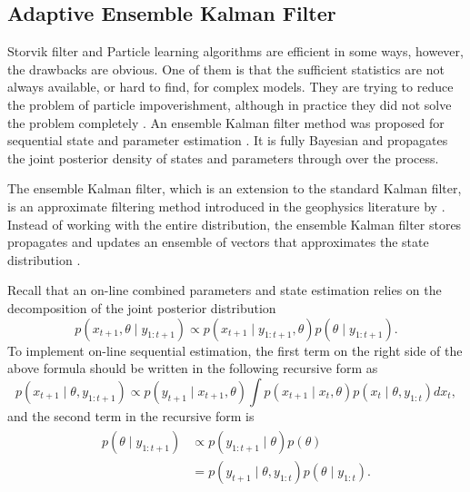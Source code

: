 \subsection{Adaptive Ensemble Kalman Filter}

Storvik filter and Particle learning algorithms are efficient in some ways,  however, the drawbacks are obvious. One of them is that the sufficient statistics are not always available, or hard to find, for complex models. They are trying to reduce the problem of particle impoverishment, although in practice they did not solve the problem completely \citep{chopin2010particle}. An ensemble Kalman filter method was proposed for sequential state and parameter estimation \citep{stroud2016bayesian}. It is fully Bayesian and propagates the joint posterior density of states and parameters through over the process. 


The ensemble Kalman filter, which is an extension to the standard Kalman filter, is an approximate filtering method introduced in the geophysics literature by \cite{evensen1994sequential}. Instead of working with the entire distribution, the ensemble Kalman filter stores propagates and updates an ensemble of vectors that approximates the state distribution \citep{katzfuss2016understanding}. 


Recall that an on-line combined parameters and state estimation relies on the decomposition of the joint posterior distribution 
\begin{equation*}\label{jointposterior}
p(x_{t+1},\theta \mid y_{1:t+1}) \propto p(x_{t+1}\mid y_{1:t+1},\theta)p(\theta\mid y_{1:t+1}).
\end{equation*}
To implement on-line sequential estimation, the first term on the right side of the above formula should be written in the following recursive form as 
\begin{equation}\label{jointposteriorterm1}
p(x_{t+1}\mid \theta, y_{1:t+1}) \propto p(y_{t+1}\mid x_{t+1},\theta) \int p(x_{t+1}\mid x_{t},\theta) p(x_{t}\mid \theta, y_{1:t})dx_{t},
\end{equation}
and the second term in the recursive form is 
\begin{align}\label{jointposteriorterm2}
\begin{split}
p(\theta\mid y_{1:t+1}) & \propto p( y_{1:t+1}\mid\theta)p(\theta) \\
&= p(y_{t+1}\mid\theta,y_{1:t})p(\theta\mid y_{1:t}).
\end{split}
\end{align}


